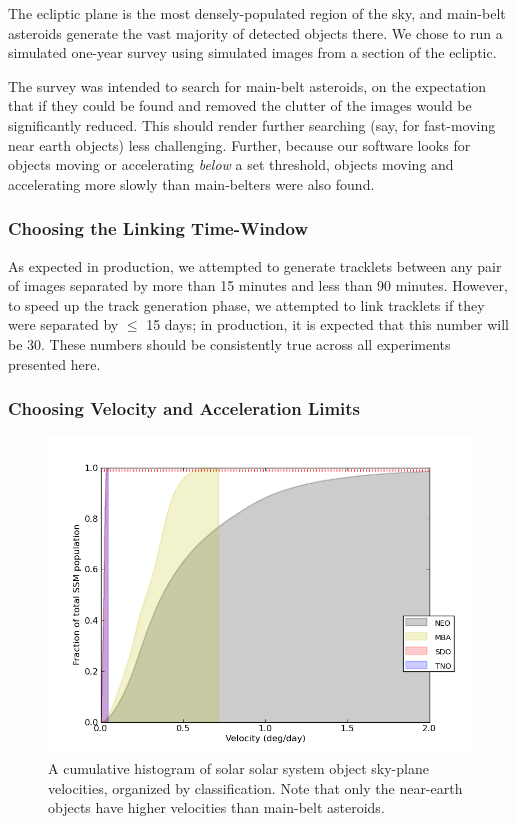 \documentclass[12pt,preprint]{aastex}
\begin{document}
The ecliptic plane is the most densely-populated region of the sky,
and main-belt asteroids generate the vast majority of detected objects
there.  We chose to run a simulated one-year survey using simulated
images from a section of the ecliptic.  

The survey was intended to search for main-belt asteroids, on the
expectation that if they could be found and removed the clutter of the
images would be significantly reduced. This should render further
searching (say, for fast-moving near earth objects) less challenging.
Further, because our software looks for objects moving or accelerating
\textit{below} a set threshold, objects moving and accelerating more
slowly than main-belters were also found.

\subsubsection{Choosing the Linking Time-Window}

As expected in production, we attempted to generate tracklets between
any pair of images separated by more than 15 minutes and less than
90 minutes.  However, to speed up the track generation phase, we
attempted to link tracklets if they were separated by $\leq$ 15 days;
in production, it is expected that this number will be 30.  These
numbers should be consistently true across all experiments presented
here.


\subsubsection{Choosing Velocity and Acceleration Limits}
\label{velAccLimits}
\begin{figure}[ht!]
  \centering
  \includegraphics[width=13cm]{illustrations/mopsplots/aug2011/n_velocity.png}
  \caption{A cumulative histogram of solar solar system object
    sky-plane velocities, organized by classification.  Note that only
    the near-earth objects have higher velocities than main-belt
    asteroids.}
  \label{velSurvey}
\end{figure}
\end{document}
